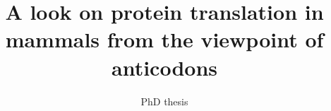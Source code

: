 \documentclass{thesis}
\begin{document}
\title{A look on protein translation in mammals from the viewpoint of anticodons}
\subtitle{PhD thesis}
\maketitle



\end{document}
